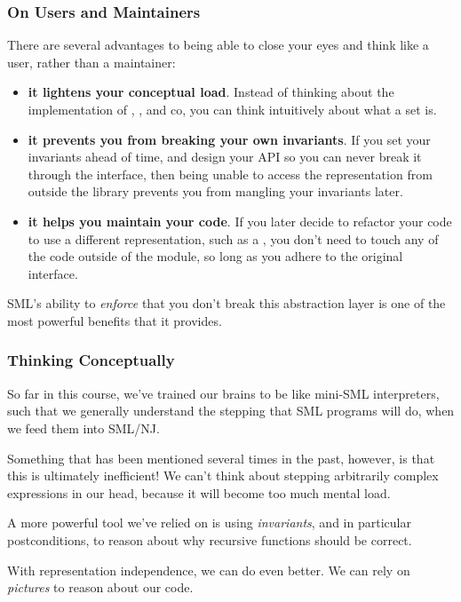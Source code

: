 \documentclass[aspectratio=169]{beamer}
\begin{document}
\begin{frame}[fragile]
  \frametitle{On Users and Maintainers}

  There are several advantages to being able to close your eyes and think like a
  user, rather than a maintainer:

  \pause
  \begin{itemize}
    \item \textbf{it lightens your conceptual load}. Instead of thinking about the implementation
    of , , and co, you can think intuitively about what
    a set is. \pause
    \item \textbf{it prevents you from breaking your own invariants}. If you set your invariants
    ahead of time, and design your API so you can never break it through the interface,
    then being unable to access the representation from outside the library prevents
    you from mangling your invariants later. \pause
    \item \textbf{it helps you maintain your code}. If you later decide to refactor your code
    to use a different representation, such as a , you don't need to
    touch any of the code outside of the module, so long as you adhere to the
    original interface.
  \end{itemize}

  \pause
  \vspace{\fill}

  SML's ability to \textit{enforce} that you don't break this abstraction layer
  is one of the most powerful benefits that it provides.
\end{frame}


\begin{frame}[fragile]
  \frametitle{Thinking Conceptually}

  So far in this course, we've trained our brains to be like mini-SML interpreters,
  such that we generally understand the stepping that SML programs will do, when we
  feed them into SML/NJ.

  \pause
  \vspace{\fill}

  Something that has been mentioned several times in the past, however, is that
  this is ultimately inefficient! We can't think about stepping arbitrarily complex
  expressions in our head, because it will become too much mental load.

  \pause
  \vspace{\fill}

  A more powerful tool we've relied on is using \textit{invariants}, and in particular
   postconditions, to reason about why recursive functions should be
  correct.

  \pause
  \vspace{\fill}

  With representation independence, we can do even better. We can rely on \textit{pictures}
  to reason about our code.
\end{frame}
\end{document}

